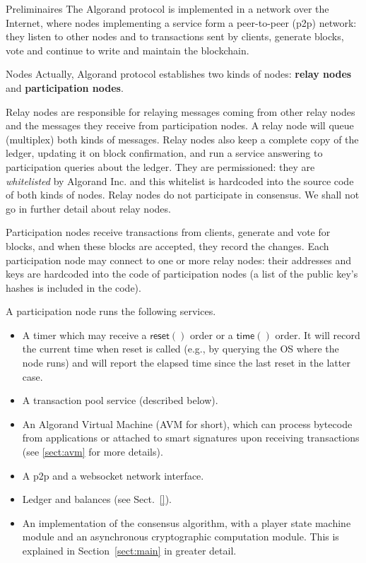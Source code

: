 \documentclass[10pt,a4paper]{article}
\begin{document}
\begin{section}{Preliminaires}
The Algorand protocol is implemented in a network over the Internet, where nodes 
implementing a service form a peer-to-peer (p2p) network: they listen to other nodes 
and to transactions sent by clients, generate blocks, vote and continue to 
write and maintain the blockchain.

\begin{subsection}{Nodes}
Actually, Algorand protocol establishes two kinds of nodes: 
{\bf relay nodes} and {\bf participation nodes}.

Relay nodes are responsible for relaying messages coming from other relay nodes
and the messages they receive from participation nodes. 
A relay node will queue (multiplex) both kinds of messages.
Relay nodes also keep a complete copy of the ledger, updating it
on block confirmation, and run a service answering to participation 
queries about the ledger.
They are permissioned: they are {\em whitelisted} by Algorand Inc.
and this whitelist is hardcoded into the source code of both kinds
of nodes.
Relay nodes do not participate in consensus.
We shall not go in further detail about relay nodes.

Participation nodes receive transactions from clients, generate and vote for blocks, and when these
blocks are accepted, they record the changes.
Each participation node may connect to one or more relay nodes: 
their addresses and keys are hardcoded into the code of participation 
nodes (a list of the public key's hashes is included in the code).

A participation node runs the following services.
\begin{itemize}
    \item A timer which may receive a $\mathsf{reset()}$ order or a $\mathsf{time()}$
        order. It will record the current time when reset is called (e.g., by querying
        the OS where the node runs) and will report the elapsed time since the last reset
        in the latter case.
    \item A transaction pool service (described below).
    \item An Algorand Virtual Machine (AVM for short), which can process bytecode
        from applications or attached to smart signatures upon receiving transactions
        (see \ref{sect:avm} for more details). 
    \item A p2p and a websocket network interface.
    \item Ledger and balances (see Sect.~\ref{}).
    \item An implementation of the consensus algorithm, with a player state machine module and
        an asynchronous cryptographic computation module. This is explained in Section~\ref{sect:main}
        in greater detail.
\end{itemize}


\end{subsection}
\end{section}
\end{document}
